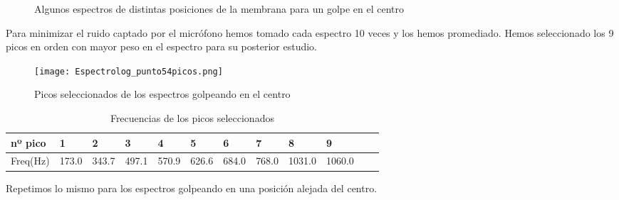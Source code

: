 \documentclass[journal, a4paper,onecolumn]{IEEEtran}
\begin{document}
    \begin{figure}[H]
        \centering
    \quad
    \quad
     \caption{Algunos espectros de distintas posiciones de la membrana para un golpe en el centro}
    \end{figure}

Para minimizar el ruido captado por el micrófono hemos tomado cada espectro 10 veces y los hemos promediado. Hemos seleccionado los 9 picos en orden con mayor peso en el espectro para su posterior estudio. 

\begin{figure}[H]
    \centering
    \texttt{[image: Espectrolog\_punto54picos.png]}
    \caption{Picos seleccionados de los espectros golpeando en el centro }
    \label{seleccion picos centrado}
\end{figure}

\begin{table}[H]
\centering
\begin{tabular}{l|l|l|l|l|l|l|l|l|l|l|l|}
nº pico & 1 & 2 & 3 & 4 & 5 & 6 & 7 & 8 & 9  \\ \hline
Freq(Hz)   & 173.0   & 343.7   & 497.1   & 570.9   & 626.6   & 684.0   & 768.0   & 1031.0    & 1060.0     
\end{tabular}
\caption{Frecuencias de los picos seleccionados}
\end{table}

Repetimos lo mismo para los espectros golpeando en una posición alejada del centro.\newline

\begin{figure}[H]%
    \centering
    \quad
    \quad
     
    \quad
\end{figure}

 \begin{figure}[H]%
 \centering
    \quad
    \quad
    \end{figure} 
    
\end{document}
